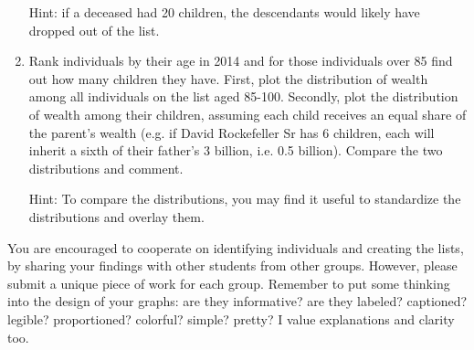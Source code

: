 \documentclass[a4,12pt]{article}%
\begin{document}
\begin{enumerate}
Hint: if a deceased had 20 children, the descendants would likely have dropped out of the list.

\item 
Rank individuals by their age in 2014 and for those individuals over 85 find out how many children they have. First, plot the distribution of wealth among all individuals on the list aged 85-100. Secondly, plot the distribution of wealth among their children, assuming each child receives an equal share of the parent's wealth (e.g. if David Rockefeller Sr has 6 children, each will inherit a sixth of their father's 3 billion, i.e. 0.5 billion). Compare the two distributions and comment.

Hint: To compare the distributions, you may find it useful to standardize the distributions and overlay them.

\end{enumerate}

You are encouraged to cooperate on identifying individuals and creating the lists, by sharing your findings with other students from other groups. However, please submit a unique piece of work for each group. Remember to put some thinking into the design of your graphs: are they informative? are they labeled? captioned? legible? proportioned? colorful? simple? pretty? I value explanations and clarity too.
\end{document}
